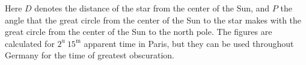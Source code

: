 Here $D$ denotes the distance of the star from the center of the Sun, and $P$ the angle that the great circle from the center of the Sun to the star makes with the great circle from the center of the Sun to the north pole. The figures are calculated for $2^{\mathrm u}\ 15^{\mathrm m}$ apparent time in Paris, but they can be used throughout Germany for the time of greatest obscuration.
\par\clearpage

